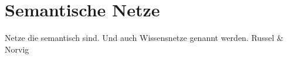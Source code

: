\chapter{Semantische Netze}
\label{chap:semantische_netze}

Netze die semantisch sind. Und auch Wissensnetze genannt werden.
Russel \& Norvig

